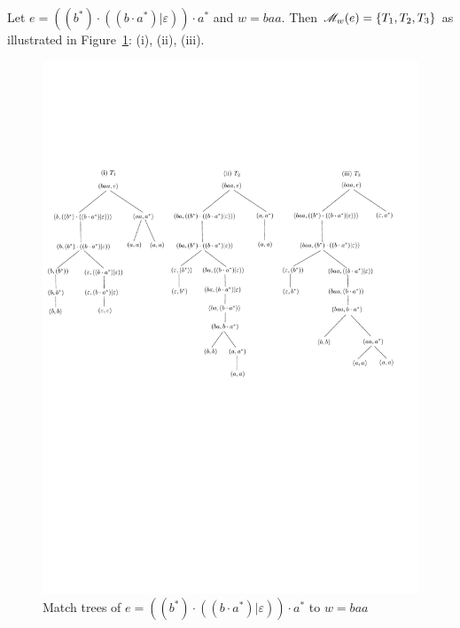   
\begin{example}\label{exmp-regex-match-tree}
Let $e = ((b^\ast) \cdot ((b \cdot a^\ast) | \varepsilon)) \cdot a^\ast$ and $w= baa$. Then $\mathscr{M}_{w}(e) = \{T_1,T_2,T_3\}$ as illustrated in Figure~\ref{fig-regex-semantics}: (i), (ii), (iii).  
\begin{figure}[ht]
\centering
\includegraphics[width=1\textwidth]{regex-semantics.pdf}
\caption{Match trees of $e=((b^\ast) \cdot ((b \cdot a^\ast) | \varepsilon)) \cdot a^\ast$ to $w= baa$}
\label{fig-regex-semantics}
\end{figure}
 \end{example}
  
